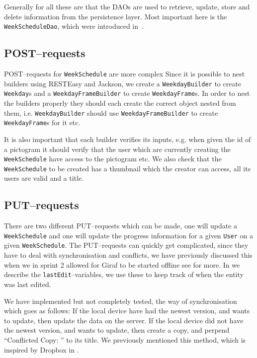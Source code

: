 Generally for all these are that the DAOs are used to retrieve, update, store and delete information from the persistence layer.
Most important here is the \texttt{WeekScheduleDao}, which were introduced in~.

\subsection{POST--requests}
POST--requests for \texttt{WeekSchedule} are more complex 
Since it is possible to nest builders using RESTEasy and Jackson, we create a \texttt{WeekdayBuilder} to create \texttt{Weekday}s and a \texttt{WeekdayFrameBuilder} to create \texttt{WeekdayFrame}s.
In order to nest the builders properly they should each create the correct object nested from them, i.e. \texttt{WeekdayBuilder} should use \texttt{WeekdayFrameBuilder} to create \texttt{WeekdayFrame}s for it etc.

It is also important that each builder verifies its inputs, e.g. when given the id of a pictogram it should verify that the user which are currently creating the \texttt{WeekSchedule} have access to the pictogram etc.
We also check that the \texttt{WeekSchedule} to be created has a thumbnail which the creator can access, all its users are valid and a title.

\subsection{PUT--requests}
There are two different PUT--requests which can be made, one will update a \texttt{WeekSchedule} and one will update the progress information for a given \texttt{User} on a given \texttt{WeekSchedule}.
The PUT--requests can quickly get complicated, since they have to deal with synchronisation and conflicts, we have previously discussed this when we in sprint 2 allowed for Giraf to be started offline see  for more.
In  we describe the \texttt{lastEdit}--variables, we use these to keep track of when the entity was last edited.

We have implemented but not completely tested, the way of synchronisation which goes as follows:
If the local device have had the newest version, and wants to update, then update the data on the server.
If the local device did not have the newest version, and wants to update, then create a copy, and perpend ``Conflicted Copy: '' to its title.
We previously mentioned this method, which is inspired by Dropbox in .

